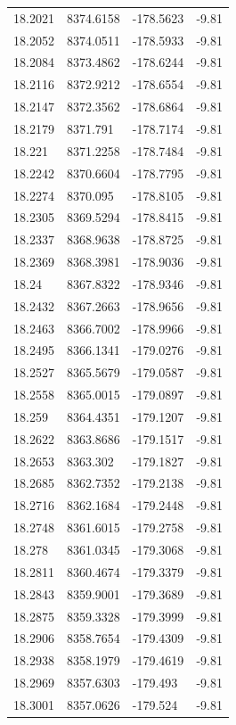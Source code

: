 \begin{table}[H]
\begin{tabular}{llll}
18.2021 & 8374.6158 & -178.5623 & -9.81 \\
18.2052 & 8374.0511 & -178.5933 & -9.81 \\
18.2084 & 8373.4862 & -178.6244 & -9.81 \\
18.2116 & 8372.9212 & -178.6554 & -9.81 \\
18.2147 & 8372.3562 & -178.6864 & -9.81 \\
18.2179 & 8371.791 & -178.7174 & -9.81 \\
18.221 & 8371.2258 & -178.7484 & -9.81 \\
18.2242 & 8370.6604 & -178.7795 & -9.81 \\
18.2274 & 8370.095 & -178.8105 & -9.81 \\
18.2305 & 8369.5294 & -178.8415 & -9.81 \\
18.2337 & 8368.9638 & -178.8725 & -9.81 \\
18.2369 & 8368.3981 & -178.9036 & -9.81 \\
18.24 & 8367.8322 & -178.9346 & -9.81 \\
18.2432 & 8367.2663 & -178.9656 & -9.81 \\
18.2463 & 8366.7002 & -178.9966 & -9.81 \\
18.2495 & 8366.1341 & -179.0276 & -9.81 \\
18.2527 & 8365.5679 & -179.0587 & -9.81 \\
18.2558 & 8365.0015 & -179.0897 & -9.81 \\
18.259 & 8364.4351 & -179.1207 & -9.81 \\
18.2622 & 8363.8686 & -179.1517 & -9.81 \\
18.2653 & 8363.302 & -179.1827 & -9.81 \\
18.2685 & 8362.7352 & -179.2138 & -9.81 \\
18.2716 & 8362.1684 & -179.2448 & -9.81 \\
18.2748 & 8361.6015 & -179.2758 & -9.81 \\
18.278 & 8361.0345 & -179.3068 & -9.81 \\
18.2811 & 8360.4674 & -179.3379 & -9.81 \\
18.2843 & 8359.9001 & -179.3689 & -9.81 \\
18.2875 & 8359.3328 & -179.3999 & -9.81 \\
18.2906 & 8358.7654 & -179.4309 & -9.81 \\
18.2938 & 8358.1979 & -179.4619 & -9.81 \\
18.2969 & 8357.6303 & -179.493 & -9.81 \\
18.3001 & 8357.0626 & -179.524 & -9.81 \\

\end{tabular}
\end{table}
